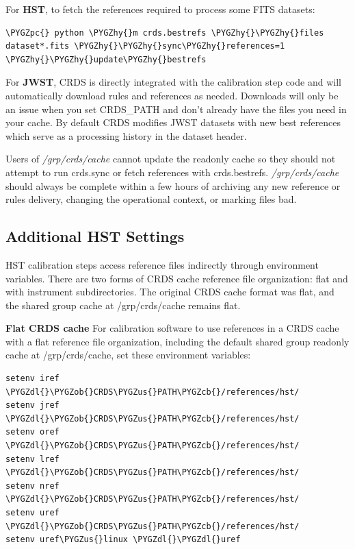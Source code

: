 \documentclass[letterpaper,10pt,english]{sphinxmanual}
\def\PYGZus{\char`\_}
\def\PYGZob{\char`\{}
\def\PYGZcb{\char`\}}
\def\PYGZpc{\char`\%}
\def\PYGZdl{\char`\$}
\def\PYGZhy{\char`\-}
\begin{document}
For \textbf{HST}, to fetch the references required to process some FITS datasets:

\begin{Verbatim}[commandchars=\\\{\}]
\PYGZpc{} python \PYGZhy{}m crds.bestrefs \PYGZhy{}\PYGZhy{}files dataset*.fits \PYGZhy{}\PYGZhy{}sync\PYGZhy{}references=1  \PYGZhy{}\PYGZhy{}update\PYGZhy{}bestrefs
\end{Verbatim}

For \textbf{JWST},  CRDS is directly integrated with the calibration step code and will automatically download
rules and references as needed.   Downloads will only be an issue when you set CRDS\_PATH and don't already
have the files you need in your cache.   By default CRDS modifies JWST datasets with new best references
which serve as a processing history in the dataset header.

Users of \emph{/grp/crds/cache} cannot update the readonly cache so they should not attempt to run crds.sync or
fetch references with crds.bestrefs.  \emph{/grp/crds/cache} should always be complete within a few hours of archiving
any new reference or rules delivery,  changing the operational context,  or marking files bad.


\subsection{Additional HST Settings}
\label{installation:additional-hst-settings}
HST calibration steps access reference files indirectly through environment variables.  There are two forms
of CRDS cache reference file organization:  flat and with instrument subdirectories.   The original CRDS cache
format was flat,  and the shared group cache at /grp/crds/cache remains flat.

\textbf{Flat CRDS cache} For calibration software to use references in a CRDS cache with a flat reference file
organization, including the default shared group readonly cache at /grp/crds/cache,  set these environment
variables:

\begin{Verbatim}[commandchars=\\\{\}]
setenv iref \PYGZdl{}\PYGZob{}CRDS\PYGZus{}PATH\PYGZcb{}/references/hst/
setenv jref \PYGZdl{}\PYGZob{}CRDS\PYGZus{}PATH\PYGZcb{}/references/hst/
setenv oref \PYGZdl{}\PYGZob{}CRDS\PYGZus{}PATH\PYGZcb{}/references/hst/
setenv lref \PYGZdl{}\PYGZob{}CRDS\PYGZus{}PATH\PYGZcb{}/references/hst/
setenv nref \PYGZdl{}\PYGZob{}CRDS\PYGZus{}PATH\PYGZcb{}/references/hst/
setenv uref \PYGZdl{}\PYGZob{}CRDS\PYGZus{}PATH\PYGZcb{}/references/hst/
setenv uref\PYGZus{}linux \PYGZdl{}\PYGZdl{}uref
\end{Verbatim}
\end{document}
